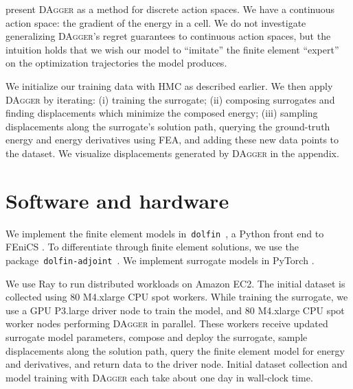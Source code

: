 \citet{ross2011reduction} present \textsc{DAgger} as a method for discrete action spaces.
We have a continuous action space: the gradient of the energy in a cell.
We do not investigate generalizing \textsc{DAgger}'s regret guarantees to continuous action spaces, but the intuition holds that we wish our model to ``imitate'' the finite element ``expert'' on the optimization trajectories the model produces.

We initialize our training data with HMC as described earlier.
We then apply \textsc{DAgger} by iterating: (i) training the surrogate; (ii) composing surrogates and finding displacements which minimize the composed energy; (iii) sampling displacements along the surrogate's solution path, querying the ground-truth energy and energy derivatives using FEA, and adding these new data points to the dataset.
We visualize displacements generated by \textsc{DAgger} in the appendix.
\section{Software and hardware}
We implement the finite element models in~\texttt{dolfin}~\citep{logg2010dolfin, logg2012dolfin}, a Python front end to FEniCS \citep{alnaes2015fenics,logg2012automated}. To differentiate through finite element solutions, we use the package~\texttt{dolfin-adjoint}~\citep{mitusch2019dolfin}. We implement surrogate models in PyTorch \citep{paszke2019pytorch}.

We use Ray \citep{moritz2018ray} to run distributed workloads on Amazon EC2. The initial dataset is collected using 80 M4.xlarge CPU spot workers. While training the surrogate, we use a GPU P3.large driver node to train the model, and 80 M4.xlarge CPU spot worker nodes performing \textsc{DAgger} in parallel. These workers receive updated surrogate model parameters, compose and deploy the surrogate, sample displacements along the solution path, query the finite element model for energy and derivatives, and return data to the driver node. Initial dataset collection and model training with \textsc{DAgger} each take about one day in wall-clock time.
